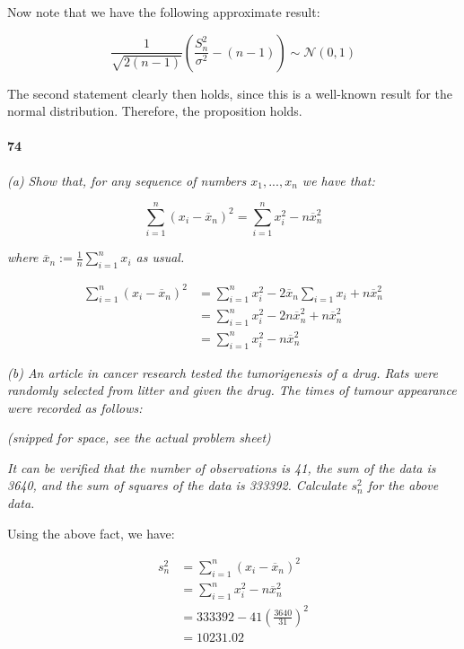             Now note that we have the following approximate result:

            \[
                \frac{1}{\sqrt{2 (n-1)}}\left(\frac{S_n^2}{\sigma^2} - (n -
                1)\right) \sim \mathcal{N}(0, 1)
            \]

            The second statement clearly then holds, since this is a
            well-known result for the normal distribution. Therefore, the
            proposition holds.

        \paragraph{74}
        \textit{(a) Show that, for any sequence of numbers $x_1, ..., x_n$
        we have that:}

        \[
            \sum_{i=1}^n (x_i - \overline x_n)^2 = \sum_{i=1}^n x_i^2 -
            n\overline x_n^2
        \]

        \textit{where $\overline x_n := \frac{1}{n} \sum\limits_{i=1}^n x_i$
        as usual.}

            \begin{align*}
                \sum_{i=1}^n (x_i - \overline x_n)^2 & = \sum_{i=1}^n x_i^2
                    - 2\overline x_n \sum_{i=1} x_i + n \overline x_n^2 \\
                & = \sum_{i=1}^n x_i^2 - 2 n\overline x_n^2 + n \overline
                    x_n^2 \\
                & = \sum_{i=1}^n x_i^2 - n\overline x_n^2
            \end{align*}

        \textit{(b) An article in cancer research tested the tumorigenesis
        of a drug. Rats were randomly selected from litter and given the
        drug. The times of tumour appearance were recorded as follows:}

        \begin{center}
            \textit{(snipped for space, see the actual problem sheet)}
        \end{center}

        \textit{It can be verified that the number of observations is 41,
        the sum of the data is 3640, and the sum of squares of the data is
        333392. Calculate $s_n^2$ for the above data.}

            Using the above fact, we have:

            \begin{align*}
                s_n^2 & = \sum_{i=1}^n (x_i - \overline x_n)^2 \\
                & = \sum_{i=1}^n x_i^2 - n\overline x_n^2 \\
                & = 333392 - 41 \left(\frac{3640}{31}\right)^2 \\
                & = 10231.02
            \end{align*}

